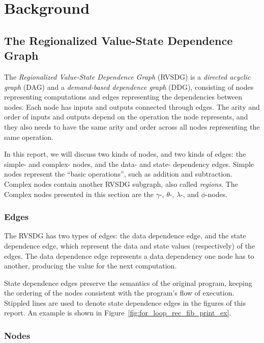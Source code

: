 
\clearpage
\section{Background}
\label{background}

\subsection{The Regionalized Value-State Dependence Graph}
\label{background:RVSDG}

The \textit{Regionalized Value-State Dependence Graph} (RVSDG) is a
\textit{directed acyclic graph} (DAG) and a \textit{demand-based dependence
graph} (DDG), consisting of nodes representing computations and edges
representing the dependencies between nodes. Each node has inputs and outputs
connected through edges. The arity and order of inputs and outputs depend on the
operation the node represents, and they also needs to have the same arity and
order across all nodes representing the same operation.

In this report, we will discuss two kinds of nodes, and two kinds of edges: the
simple- and complex- nodes, and the data- and state- dependency edges. Simple
nodes represent the ``basic operations'', such as addition and subtraction.
Complex nodes contain another RVSDG subgraph, also called \textit{regions}. The
Complex nodes presented in this section are the $\gamma$-, $\theta$-,
$\lambda$-, and $\phi$-nodes.

\subsubsection{Edges}

The RVSDG has two types of edges: the data dependence edge, and the state
dependence edge, which represent the data and state values (respectively) of the
edges. The data dependence edge represents a data dependency one node has to
another, producing the value for the next computation.

State dependence edges preserve the semantics of the original program, keeping
the ordering of the nodes consistent with the program's flow of execution.
Stippled lines are used to denote state dependence edges in the figures of this
report. An example is shown in Figure~\ref{fig:for_loop_rec_fib_print_ex}.

\subsubsection{Nodes}

